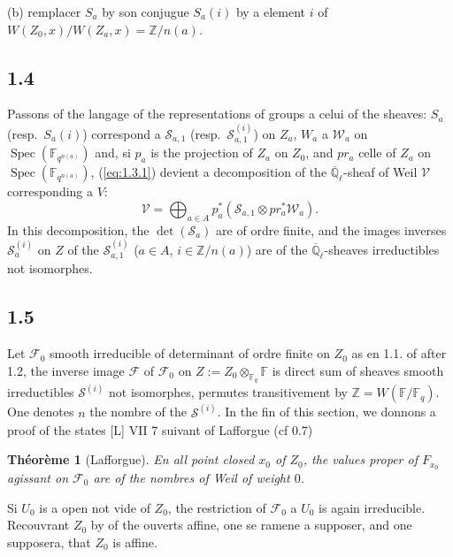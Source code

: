 \documentclass[11pt,a4paper]{article}
\theoremstyle{plain}
\newtheorem{theorem}{Th\'eor\`eme}
\theoremstyle{definition}
\DeclareMathOperator{\Spec}{Spec}
\begin{document}
(b) remplacer $S_a$ by son conjugue $S_a(i)$ by a element $i$ of $W(Z_0,x)/W(Z_a,x) = \mathbb{Z}/n(a)$.

\subsection{1.4}

Passons of the langage of the representations of groups a celui of the sheaves: $S_a$ (resp.~$S_a(i)$) correspond a $\mathcal{S}_{a,1}$ (resp.~$\mathcal{S}_{a,1}^{(i)}$) on $Z_a$, $W_a$ a $\mathcal{W}_a$ on $\Spec(\mathbb{F}_{q^{n(a)}})$ and, si $p_a$ is the projection of $Z_a$ on $Z_0$, and $pr_a$ celle of $Z_a$ on $\Spec(\mathbb{F}_{q^{n(a)}})$, (\ref{eq:1.3.1}) devient a decomposition of the $\overline{\mathbb{Q}}_\ell$-sheaf of Weil $\mathcal{V}$ corresponding a $V$:
\begin{equation}\label{eq:1.4.1}
\mathcal{V} = \bigoplus_{a \in A} p_a^*(\mathcal{S}_{a,1} \otimes pr_a^* \mathcal{W}_a).
\end{equation}
In this decomposition, the $\det(\mathcal{S}_a)$ are of ordre finite, and the images inverses $\mathcal{S}_a^{(i)}$ on $Z$ of the $\mathcal{S}_{a,1}^{(i)}$ ($a \in A$, $i \in \mathbb{Z}/n(a)$) are of the $\overline{\mathbb{Q}}_\ell$-sheaves irreductibles not isomorphes.

\subsection{1.5}

Let $\mathcal{F}_0$ smooth irreducible of determinant of ordre finite on $Z_0$ as en 1.1. of after 1.2, the inverse image $\mathcal{F}$ of $\mathcal{F}_0$ on $Z := Z_0 \otimes_{\mathbb{F}_q} \mathbb{F}$ is direct sum of sheaves smooth irreductibles $\mathcal{S}^{(i)}$ not isomorphes, permutes transitivement by $\mathbb{Z} = W(\mathbb{F}/\mathbb{F}_q)$. One denotes $n$ the nombre of the $\mathcal{S}^{(i)}$. In the fin of this section, we donnons a proof of the states [L] VII 7 suivant of Lafforgue (cf 0.7)

\begin{theorem}[Lafforgue]\label{thm:1.6}
En all point closed $x_0$ of $Z_0$, the values proper of $F_{x_0}$ agissant on $\mathcal{F}_0$ are of the nombres of Weil of weight $0$.
\end{theorem}

Si $U_0$ is a open not vide of $Z_0$, the restriction of $\mathcal{F}_0$ a $U_0$ is again irreducible. Recouvrant $Z_0$ by of the ouverts affine, one se ramene a supposer, and one supposera, that $Z_0$ is affine.
\end{document}
